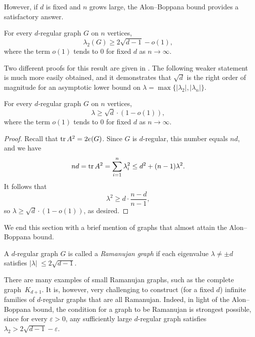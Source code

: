 However, if $d$ is fixed and $n$ grows large, the Alon--Boppana bound provides a satisfactory answer.
\begin{theorem}
    For every $d$-regular graph $G$ on $n$ vertices, 
    \begin{equation*}
        \lambda_2(G) \ge 2\sqrt{d - 1} - o(1),
    \end{equation*}
    where the term $o(1)$ tends to $0$ for fixed $d$ as $n \rightarrow \infty$.
\end{theorem}

Two different proofs for this result are given in \cite[Section 5]{expandergraphs}. 
The following weaker statement is much more easily obtained, and it demonstrates that $\sqrt{d}$ is the right order of magnitude for an asymptotic lower bound on $\lambda = \max \{ |\lambda_2|, |\lambda_n| \}$.

\begin{proposition}
    For every $d$-regular graph $G$ on $n$ vertices, 
    \begin{equation*}
        \lambda \ge \sqrt{d} \cdot (1 - o(1)),
    \end{equation*}
    where the term $o(1)$ tends to $0$ for fixed $d$ as $n \rightarrow \infty$.
\end{proposition}

\begin{proof}
    Recall that $\operatorname{tr} A^2 = 2 e(G)$. 
    Since $G$ is $d$-regular, this number equals $nd$, and we have
    \begin{equation*}
        nd = \operatorname{tr} A^2 = \sum \limits_{i = 1}^n \lambda_i^2 \le d^2 + (n - 1)\lambda^2.
    \end{equation*}
    It follows that
    \begin{equation*}
        \lambda^2 \ge d \cdot \frac{n - d}{n - 1},
    \end{equation*}
    so $\lambda \ge \sqrt{d} \cdot (1 - o(1))$, as desired.
\end{proof}

We end this section with a brief mention of graphs that almost attain the Alon--Boppana bound.
\begin{definition}
    A $d$-regular graph $G$ is called a \textit{Ramanujan graph} if each eigenvalue $\lambda \ne \pm d$ satisfies $|\lambda|\; \le 2\sqrt{d - 1}$.
\end{definition}

There are many examples of small Ramanujan graphs, such as the complete \sloppy \mbox{graph $K_{d +1}$}.
It is, however, very challenging to construct (for a fixed $d$) infinite families of $d$-regular graphs that are all Ramanujan.
Indeed, in light of the Alon--Boppana bound, the condition for a graph to be Ramanujan is strongest possible, since for every $\varepsilon > 0$, any sufficiently large $d$-regular graph satisfies $\lambda_2 > 2\sqrt{d - 1} - \varepsilon$.


